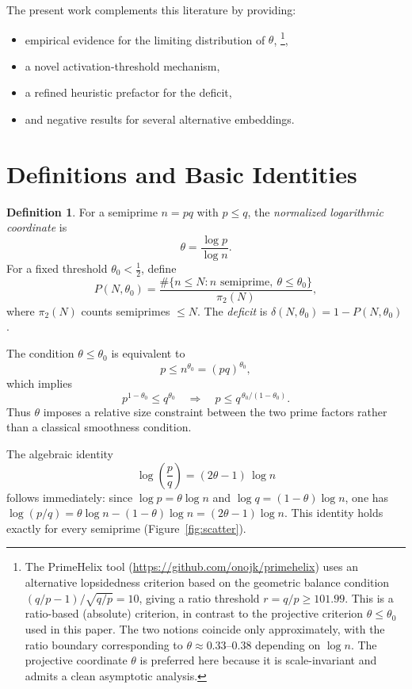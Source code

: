 \documentclass[11pt]{article}
\theoremstyle{definition}
\newtheorem{definition}{Definition}
\begin{document}
The present work complements this literature by providing:
\begin{itemize}
  \item empirical evidence for the limiting distribution of \(\theta\),%
\footnote{The PrimeHelix tool (\url{https://github.com/onojk/primehelix})
uses an alternative lopsidedness criterion based on the geometric
balance condition $(q/p - 1)/\sqrt{q/p} = 10$, giving a ratio
threshold $r = q/p \geq 101.99$.  This is a ratio-based (absolute)
criterion, in contrast to the projective criterion $\theta \leq
\theta_0$ used in this paper.  The two notions coincide only
approximately, with the ratio boundary corresponding to
$\theta \approx 0.33$--$0.38$ depending on $\log n$.  The
projective coordinate $\theta$ is preferred here because it is
scale-invariant and admits a clean asymptotic analysis.},
  \item a novel activation-threshold mechanism,
  \item a refined heuristic prefactor for the deficit,
  \item and negative results for several alternative embeddings.
\end{itemize}


\section{Definitions and Basic Identities}

\begin{definition}
For a semiprime \(n = pq\) with \(p \leq q\), the \emph{normalized logarithmic
coordinate} is
\[
  \theta = \frac{\log p}{\log n}.
\]
For a fixed threshold \(\theta_0 < \tfrac{1}{2}\), define
\[
  P(N,\theta_0) =
  \frac{\#\{n \le N : n\text{ semiprime},\ \theta \le \theta_0\}}{\pi_2(N)},
\]
where \(\pi_2(N)\) counts semiprimes \(\le N\).  The \emph{deficit} is
\(\delta(N,\theta_0) = 1 - P(N,\theta_0)\).
\end{definition}

The condition \(\theta \leq \theta_0\) is equivalent to
\[
  p \leq n^{\theta_0} = (pq)^{\theta_0},
\]
which implies
\[
  p^{1-\theta_0} \leq q^{\theta_0} \quad \Longrightarrow \quad
  p \leq q^{\,\theta_0/(1-\theta_0)}.
\]
Thus \(\theta\) imposes a relative size constraint between the two prime factors rather
than a classical smoothness condition.

The algebraic identity
\begin{equation}\label{eq:identity}
  \log\!\left(\frac{p}{q}\right) = (2\theta - 1)\,\log n
\end{equation}
follows immediately: since \(\log p = \theta\log n\) and \(\log q = (1-\theta)\log n\),
one has \(\log(p/q) = \theta\log n - (1-\theta)\log n = (2\theta-1)\log n\).  This
identity holds exactly for every semiprime (Figure~\ref{fig:scatter}).
\end{document}
